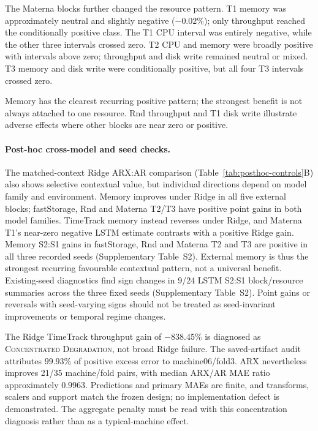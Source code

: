 \documentclass[5p,twocolumn]{elsarticle}
\begin{document}
The Materna blocks further changed the resource pattern. T1 memory was
approximately neutral and slightly negative ($-0.02\%$); only throughput
reached the conditionally positive class. The T1 CPU interval was entirely
negative, while the other three intervals crossed zero. T2 CPU and memory
were broadly positive with intervals above zero; throughput and disk write
remained neutral or mixed. T3 memory and disk write were conditionally
positive, but all four T3 intervals crossed zero.

Memory has the clearest recurring positive pattern; the strongest benefit is
not always attached to one resource. Rnd throughput and T1 disk write illustrate
adverse effects where other blocks are near zero or positive.

\paragraph{Post-hoc cross-model and seed checks.}
The matched-context Ridge ARX:AR comparison
(Table~\ref{tab:posthoc-controls}B) also shows selective contextual value,
but individual directions depend on model family and environment. Memory
improves under Ridge in all five external blocks; fastStorage, Rnd and
Materna T2/T3 have positive point gains in both model families. TimeTrack
memory instead reverses under Ridge, and Materna T1's near-zero negative
LSTM estimate contrasts with a positive Ridge gain. Memory S2:S1 gains in
fastStorage, Rnd and Materna T2 and T3 are positive in all three recorded
seeds (Supplementary Table~S2). External memory is thus
the strongest recurring favourable contextual pattern, not a universal
benefit. Existing-seed diagnostics find sign changes in 9/24 LSTM S2:S1
block/resource summaries across the three fixed seeds (Supplementary
Table~S2). Point gains or reversals with seed-varying signs should not be
treated as seed-invariant improvements or temporal regime changes.

The Ridge TimeTrack throughput gain of $-838.45\%$ is diagnosed as
\textsc{Concentrated Degradation}, not broad Ridge failure. The saved-artifact
audit attributes $99.93\%$ of positive excess error to machine06/fold3.
ARX nevertheless improves 21/35 machine/fold pairs, with median ARX/AR MAE
ratio approximately $0.9963$. Predictions and primary MAEs are finite, and
transforms, scalers and support match the frozen design; no implementation
defect is demonstrated. The aggregate penalty must be read with this
concentration diagnosis rather than as a typical-machine effect.
\end{document}
